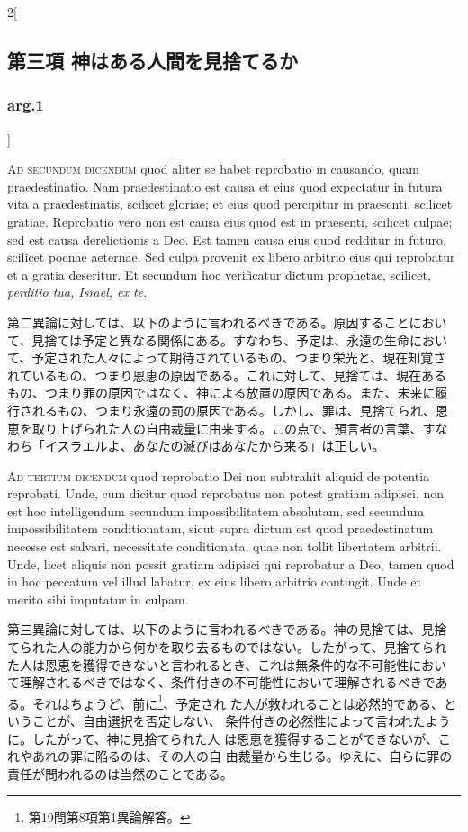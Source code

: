 \documentclass[paper=a4paper,fontsize=10pt,jafontsize=9pt,titlepage]{jlreq}
\begin{document}
\begin{paracol}{2}[\subsection{第三項 神はある人間を見捨てるか}\subsubsection{arg.1}]
\switchcolumn*[\subsubsection{ad.2}]


{\scshape Ad secundum dicendum} quod aliter se habet
reprobatio in causando, quam praedestinatio. Nam praedestinatio est
causa et eius quod expectatur in futura vita a praedestinatis, scilicet
gloriae; et eius quod percipitur in praesenti, scilicet
gratiae. Reprobatio vero non est causa eius quod est in praesenti,
scilicet culpae; sed est causa derelictionis a Deo. Est tamen causa eius
quod redditur in futuro, scilicet poenae aeternae. Sed culpa provenit ex
libero arbitrio eius qui reprobatur et a gratia deseritur. Et secundum
hoc verificatur dictum prophetae, scilicet, {\itshape perditio tua, Israel, ex te}.


\switchcolumn


第二異論に対しては、以下のように言われるべきである。原因することにおい
て、見捨ては予定と異なる関係にある。すなわち、予定は、永遠の生命におい
て、予定された人々によって期待されているもの、つまり栄光と、現在知覚さ
れているもの、つまり恩恵の原因である。これに対して、見捨ては、現在ある
もの、つまり罪の原因ではなく、神による放置の原因である。また、未来に履
行されるもの、つまり永遠の罰の原因である。しかし、罪は、見捨てられ、恩
恵を取り上げられた人の自由裁量に由来する。この点で、預言者の言葉、すな
わち「イスラエルよ、あなたの滅びはあなたから来る」は正しい。


\switchcolumn*[\subsubsection{ad.3}]


{\scshape Ad tertium dicendum} quod reprobatio Dei non
subtrahit aliquid de potentia reprobati. Unde, cum dicitur quod
reprobatus non potest gratiam adipisci, non est hoc intelligendum
secundum impossibilitatem absolutam, sed secundum impossibilitatem
conditionatam, sicut supra dictum est quod praedestinatum necesse est
salvari, necessitate conditionata, quae non tollit libertatem
arbitrii. Unde, licet aliquis non possit gratiam adipisci qui reprobatur
a Deo, tamen quod in hoc peccatum vel illud labatur, ex eius libero
arbitrio contingit. Unde et merito sibi imputatur in culpam.


\switchcolumn


第三異論に対しては、以下のように言われるべきである。神の見捨ては、見捨
てられた人の能力から何かを取り去るものではない。したがって、見捨てられ
た人は恩恵を獲得できないと言われるとき、これは無条件的な不可能性におい
て理解されるべきではなく、条件付きの不可能性において理解されるべきであ
る。それはちょうど、前に\footnote{第19問第8項第1異論解答。}、予定され
た人が救われることは必然的である、ということが、自由選択を否定しない、
条件付きの必然性によって言われたように。したがって、神に見捨てられた人
は恩恵を獲得することができないが、これやあれの罪に陥るのは、その人の自
由裁量から生じる。ゆえに、自らに罪の責任が問われるのは当然のことである。


\switchcolumn*



\end{paracol}
\end{document}
